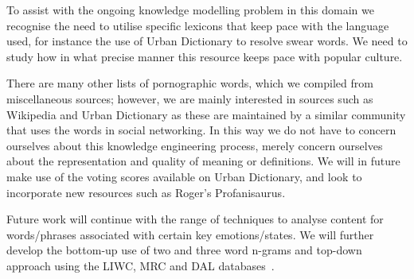 \documentclass[letterpaper]{article}
\begin{document}
To assist with the ongoing knowledge modelling problem in this domain
we recognise the need to utilise specific lexicons that keep pace with
the language used, for instance the use of Urban Dictionary to resolve
swear words. We need to study how in what precise manner this resource
keeps pace with popular culture.

There are many other lists of pornographic words, which we compiled
from miscellaneous sources; however, we are mainly interested in
sources such as Wikipedia and Urban Dictionary as these are maintained
by a similar community that uses the words in social networking. In this
way we do not have to concern ourselves about this knowledge
engineering process, merely concern ourselves about the representation
and quality of meaning or definitions. We will in future make use of
the voting scores available on Urban Dictionary, and look to
incorporate new resources such as Roger's Profanisaurus.

Future work will continue with the range of techniques to analyse
content for words/phrases associated with certain key
emotions/states. We will further develop the bottom-up use of two and
three word n-grams and top-down approach using the LIWC, MRC and DAL
databases~\cite{iacobelli-et-al:2011}.




\end{document}
